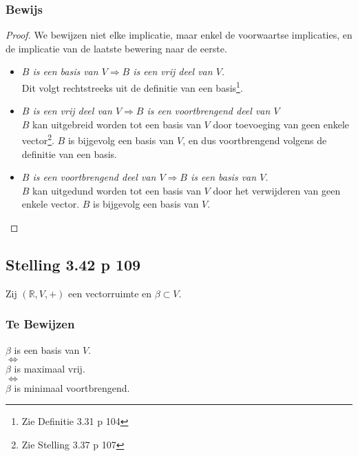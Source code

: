 \documentclass[lineaire_algebra_oplossingen.tex]{subfiles}
\begin{document}
\subsubsection*{Bewijs}
\begin{proof}
We bewijzen niet elke implicatie, maar enkel de voorwaartse implicaties, en de implicatie van de laatste bewering naar de eerste.
\begin{itemize}
\item \emph{$B$ is een basis van $V \Rightarrow B$ is een vrij deel van $V$.}\\
Dit volgt rechtstreeks uit de definitie van een basis\footnote{Zie Definitie 3.31 p 104}.
\item \emph{$B$ is een vrij deel van $V \Rightarrow B$ is een voortbrengend deel van $V$}\\
$B$ kan uitgebreid worden tot een basis van $V$ door toevoeging van geen enkele vector\footnote{Zie Stelling 3.37 p 107}. $B$ is bijgevolg een basis van $V$, en dus voortbrengend volgens de definitie van een basis.
\item \emph{$B$ is een voortbrengend deel van $V \Rightarrow B$ is een basis van $V$.}\\
$B$ kan uitgedund worden tot een basis van $V$ door het verwijderen van geen enkele vector. $B$ is bijgevolg een basis van $V$.
\end{itemize}
\end{proof}


\subsection{Stelling 3.42 p 109}
\label{3.42}
Zij $(\mathbb{R},V,+)$ een vectorruimte en $\beta \subset V$.

\subsubsection*{Te Bewijzen}
\begin{center}
$\beta$ is een basis van $V$.\\$\Leftrightarrow$\\
$\beta$ is maximaal vrij.\\$\Leftrightarrow$\\
$\beta$ is minimaal voortbrengend.
\end{center}
\end{document}
